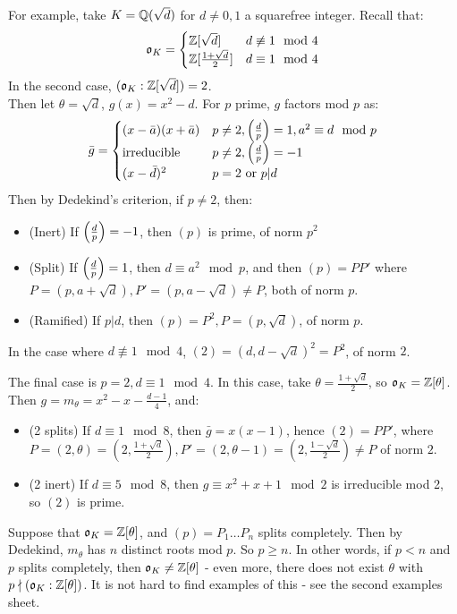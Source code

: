 \documentclass[10pt,a4paper]{article}
\begin{document}
For example, take $K = \mathbb{Q}(\sqrt{d})$ for $d \neq 0,1$ a squarefree integer. Recall that:
\begin{align*}
\mathfrak{o}_K = \begin{cases} \mathbb{Z}[\sqrt{d}] & d \not\equiv 1 \mod 4\\ \mathbb{Z}[\frac{1+\sqrt{d}}{2}] & d \equiv 1 \mod 4 \end{cases}
\end{align*}
In the second case, $(\mathfrak{o}_K:\mathbb{Z}[\sqrt{d}]) = 2$. \\
Then let $\theta = \sqrt{d}$, $g(x) = x^2-d$. For $p$ prime, $g$ factors mod $p$ as:
\begin{align*}
\bar{g} = \begin{cases} (x-\bar{a})(x+\bar{a}) & p \neq 2, \left(\frac{d}{p}\right)=1, a^2 \equiv d \mod p \\ \text{irreducible} & p \neq 2, \left(\frac{d}{p}\right) = -1 \\ (x-\bar{d})^2 & p = 2\text{ or } p|d \end{cases}
\end{align*}
Then by Dedekind's criterion, if $p \neq 2$, then:
\begin{itemize}
\item (Inert) If $\left(\frac{d}{p}\right) = -1$, then $(p)$ is prime, of norm $p^2$
\item (Split) If $\left(\frac{d}{p}\right) = 1$, then $d \equiv a^2 \mod p$, and then $(p) = PP'$ where $P = (p, a+\sqrt{d}), P' = (p, a-\sqrt{d}) \neq P$, both of norm $p$.
\item (Ramified) If $p|d$, then $(p) = P^2, P = (p, \sqrt{d})$, of norm $p$.
\end{itemize}

In the case where $d \nequiv 1 \mod 4$, $(2) = (d, d-\sqrt{d})^2 = P^2$, of norm $2$.

The final case is $p = 2, d \equiv 1 \mod 4$. In this case, take $\theta = \frac{1+\sqrt{d}}{2}$, so $\mathfrak{o}_K = \mathbb{Z}[\theta]$. Then $g = m_\theta = x^2-x-\frac{d-1}{4}$, and:
\begin{itemize}
\item (2 splits) If $d \equiv 1 \mod 8$, then $\bar{g} = x(x-1)$, hence $(2) = PP'$, where $P = (2, \theta) = (2, \frac{1+\sqrt{d}}{2}), P' = (2, \theta-1) = (2, \frac{1-\sqrt{d}}{2}) \neq P$ of norm $2$.
\item (2 inert) If $d \equiv 5 \mod 8$, then $g \equiv x^2+x+1 \mod 2$ is irreducible mod 2, so $(2)$ is prime.
\end{itemize}

Suppose that $\mathfrak{o}_K = \mathbb{Z}[\theta]$, and $(p) = P_1 \ldots P_n$ splits completely. Then by Dedekind, $m_\theta$ has $n$ distinct roots mod $p$. So $p \geq n$. In other words, if $p < n$ and $p$ splits completely, then $\mathfrak{o}_K \neq \mathbb{Z}[\theta]$ - even more, there does not exist $\theta$ with $p \nmid (\mathfrak{o}_K : \mathbb{Z}[\theta])$. It is not hard to find examples of this - see the second examples sheet.
\end{document}
